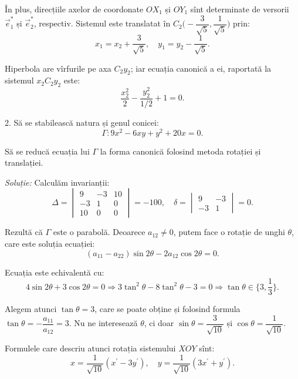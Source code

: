 În plus, direcțiile axelor de coordonate $OX_1$ și $OY_1$ sînt determinate de
versorii $\vec{e}_1^\ast$ și $\vec{e}_2^\ast$, respectiv. Sistemul este
translatat în $C_2 \Big( -\dfrac{3}{\sqrt{5}}, \dfrac{1}{\sqrt{5}} \Big)$ prin: 
 \[
	x_1 = x_2 + \dfrac{3}{\sqrt{5}}, \quad y_1 = y_2 - \dfrac{1}{\sqrt{5}}.
\]

Hiperbola are vîrfurile pe axa $C_2y_2$; iar ecuația canonică a ei, raportată
la sistemul $x_2C_2y_2$ este: 
 \[
	\dfrac{x_2^2}{2} - \dfrac{y_2^2}{1/2} + 1 = 0.
\]

\vspace{1cm}

2. Să se stabilească natura și genul conicei: 
 \[
	\Gamma : 9x^2 - 6xy + y^2 + 20x = 0.
\]

Să se reducă ecuația lui $\Gamma$ la forma canonică folosind metoda rotației
și translației.

\emph{Soluție:}
	Calculăm invarianții: 
 \[
	\Delta = \begin{vmatrix}
	             9 & -3 & 10 \\
	            -3 & 1 & 0 \\
	            10 & 0 & 0
             \end{vmatrix} = -100, \quad \delta = \begin{vmatrix}
	                                                  9 & -3 \\
	                                                  -3 & 1
                                                  \end{vmatrix} = 0.
\]

Rezultă că $\Gamma$ este o parabolă. Deoarece $a_{12} \neq 0$, putem face o
rotație de unghi $\theta$, care este soluția ecuației: 
 \[
	(a_{11} - a_{22}) \sin 2\theta - 2 a_{12} \cos 2 \theta = 0.
\]

Ecuația este echivalentă cu: 
 \[
	4 \sin 2 \theta + 3 \cos 2 \theta = 0 \Longrightarrow 
	3 \tan^2 \theta - 8 \tan^2 \theta - 3 = 0 \Longrightarrow 
	\tan\theta \in \{3, \frac{1}{3} \}.
\]

Alegem atunci $\tan \theta = 3$, care se poate obține și folosind formula
$\tan \theta = - \dfrac{a_{11}}{a_{12}} = 3$. Nu ne interesează $\theta$, ci
doar $\sin\theta = \dfrac{3}{\sqrt{10}}$ și $\cos\theta = \dfrac{1}{\sqrt{10}}$.

Formulele care descriu atunci rotația sistemului $XOY$ sînt: 
 \[
	x = \dfrac{1}{\sqrt{10}}(x^{\prime} - 3y^{\prime}), \quad
	y = \dfrac{1}{\sqrt{10}}(3x^{\prime} + y^{\prime}).
\]

